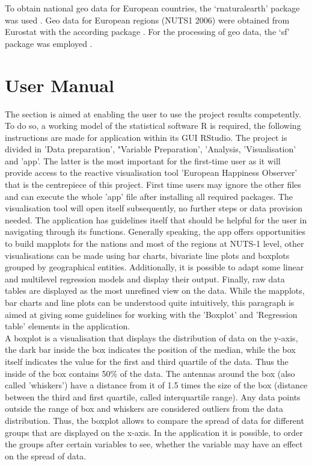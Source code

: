 \documentclass[preprint,12pt,authoryear]{elsarticle}
\begin{document}
To obtain national geo data for European countries, the `rnaturalearth' package was used \citep{south_rnaturalearth:_2017}.
Geo data for European regions (NUTS1 2006) were obtained from Eurostat with the according package \citep{lahti_eurostat:_2019}. For the 
processing of geo data, the `sf' package was employed \citep{pebesma_sf:_2018}.
	
\section{User Manual}
The section is aimed at enabling the user to use the project results competently. To do so, a working model of the statistical software R is required, the following instructions are made for application within its GUI RStudio. The project is divided in 'Data preparation', "Variable Preparation', 'Analysis, 'Visualisation' and 'app'. The latter is the most important for the first-time user as it will provide access to the reactive visualisation tool 'European Happiness Observer' that is the centrepiece of this project. First time users may ignore the other files and can execute the whole 'app' file after installing all required packages. The visualisation tool will open itself subsequently, no further steps or data provision needed. The application has guidelines itself that should be helpful for the user in navigating through its functions. Generally speaking, the app offers opportunities to build mapplots for the nations and most of the regions at NUTS-1 level, other visualisations can be made using bar charts, bivariate line plots and boxplots grouped by geographical entities. Additionally, it is possible to adapt some linear and multilevel regression models and display their output. Finally, raw data tables are displayed as the most unrefined view on the data. While the mapplots, bar charts and line plots can be understood quite intuitively, this paragraph is aimed at giving some guidelines for working with the 'Boxplot' and 'Regression table' elements in the application.\\

A boxplot is a visualisation that displays the distribution of data on the y-axis, the dark bar inside the box indicates the position of the median, while the box itself indicates the value for the first and third quartile of the data. Thus the inside of the box contains 50\% of the data. The antennas around the box (also called 'whiskers') have a distance from it of 1.5 times the size of the box (distance between the third and first quartile, called interquartile range). Any data points outside the range of box and whiskers are considered outliers from the data distribution. Thus, the boxplot allows to compare the spread of data for different groups that are displayed on the x-axis. In the application it is possible, to order the groups after certain variables to see, whether the variable may have an effect on the spread of data.\\
\end{document}

